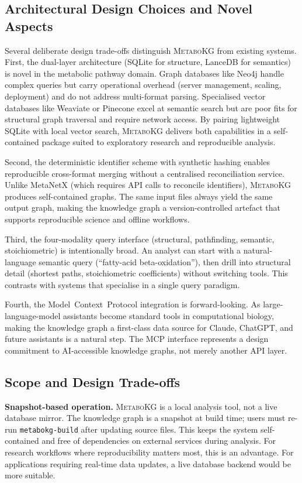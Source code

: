 \documentclass[10pt]{article}
\begin{document}
\subsection{Architectural Design Choices and Novel Aspects}

Several deliberate design trade-offs distinguish \textsc{MetaboKG} from existing
systems. First, the dual-layer architecture (SQLite for structure, LanceDB for
semantics) is novel in the metabolic pathway domain. Graph databases like
Neo4j handle complex queries but carry operational overhead (server
management, scaling, deployment) and do not address multi-format parsing.
Specialised vector databases like Weaviate or Pinecone excel at semantic
search but are poor fits for structural graph traversal and require network
access. By pairing lightweight SQLite with local vector search,
\textsc{MetaboKG} delivers both capabilities in a self-contained package suited
to exploratory research and reproducible analysis.

Second, the deterministic identifier scheme with synthetic hashing enables
reproducible cross-format merging without a centralised reconciliation
service. Unlike MetaNetX (which requires API calls to reconcile identifiers),
\textsc{MetaboKG} produces self-contained graphs. The same input files always
yield the same output graph, making the knowledge graph a version-controlled
artefact that supports reproducible science and offline workflows.

Third, the four-modality query interface (structural, pathfinding, semantic,
stoichiometric) is intentionally broad. An analyst can start with a
natural-language semantic query (``fatty-acid beta-oxidation''), then drill
into structural detail (shortest paths, stoichiometric coefficients) without
switching tools. This contrasts with systems that specialise in a single query
paradigm.

Fourth, the Model~Context~Protocol integration is forward-looking. As
large-language-model assistants become standard tools in computational biology,
making the knowledge graph a first-class data source for Claude, ChatGPT, and
future assistants is a natural step. The MCP interface represents a design
commitment to AI-accessible knowledge graphs, not merely another API layer.

\subsection{Scope and Design Trade-offs}

\textbf{Snapshot-based operation.} \textsc{MetaboKG} is a local analysis tool,
not a live database mirror. The knowledge graph is a snapshot at build time;
users must re-run \texttt{metabokg-build} after updating source files. This
keeps the system self-contained and free of dependencies on external services
during analysis. For research workflows where reproducibility matters most,
this is an advantage. For applications requiring real-time data updates, a
live database backend would be more suitable.
\end{document}
